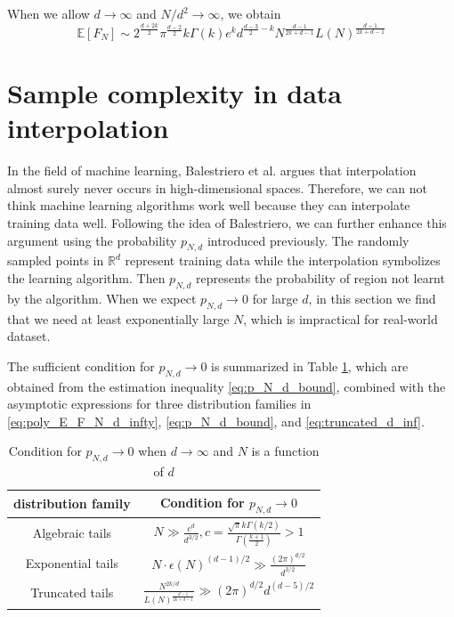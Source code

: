 \documentclass{aptpub}
\def\E{\mathbb{E}}
\def\R{\mathbb{R}}
\begin{document}
 When we allow $d\to \infty$ and $N/d^2 \to \infty$, we obtain
 \begin{equation}\label{eq:truncated_d_inf}
  \E[F_N] \sim 2^{\frac{d+2k}{2}}\pi^{\frac{d-2}{2}} k\Gamma(k)e^k d^{\frac{d-3}{2}-k}
  N^{\frac{d-1}{2k+d-1}} L(N)^{\frac{d-1}{2k+d-1}}
 \end{equation}
\section{Sample complexity in data interpolation}\label{sec:sample_complexity}
In the field of machine learning,
Balestriero et al. \cite{balestriero2021learning}
argues that interpolation almost surely never occurs in high-dimensional spaces.
Therefore, we can not think machine learning algorithms work well because they can interpolate training data
well.
Following the idea of Balestriero, we can further enhance this argument using the probability $p_{N,d}$ introduced previously.
The randomly sampled points in $\R^d$ represent training data
while the interpolation
symbolizes the learning algorithm. Then $p_{N,d}$ represents
the probability of region not learnt by the algorithm.
When we expect $p_{N,d} \to 0$ for large $d$,
in this section
we find that we need
at least exponentially large $N$,
which is impractical for real-world dataset.

The sufficient condition for $p_{N,d} \to 0$ is summarized in Table \ref{tab:cond},
which are obtained
from the estimation inequality \eqref{eq:p_N_d_bound},
combined with the asymptotic expressions for three distribution families in \eqref{eq:poly_E_F_N_d_infty},
\eqref{eq:p_N_d_bound}, and
\eqref{eq:truncated_d_inf}.


\begin{table}[!ht]
     \centering
     \begin{tabular}{cc}
         \hline
         distribution family &  Condition for $p_{N,d} \to 0$ \\
         \hline
        Algebraic tails & $N \gg \frac{c^d}{d^{3/2}}, c=\frac{\sqrt{\pi}k\Gamma(k/2)}{\Gamma(\frac{k+1}{2})}>1$ \\
        \hline
        Exponential tails 
        & $ N\cdot \epsilon(N)^{(d-1)/2} \gg \frac{(2\pi)^{d/2}}{d^{3/2}}$ \\
        \hline
        Truncated tails 
        & $\frac{N^{2k/d}}{L(N)^{\frac{d-1}{2k+d-1}}}
        \gg (2\pi)^{d/2}d^{(d-5)/2}$\\
        \hline
     \end{tabular}
     \caption{Condition for $p_{N,d}\to 0$ when $d\to \infty$ and $N$ is a function of $d$}
     \label{tab:cond}
 \end{table}
\end{document}
